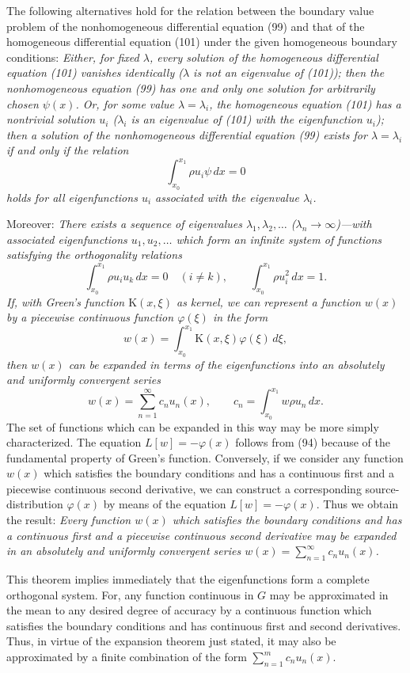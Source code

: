 The following alternatives hold for the relation between the boundary value problem of the nonhomogeneous differential equation (99) and that of the homogeneous differential equation (101) under the given homogeneous boundary conditions: \emph{Either, for fixed $\lambda$, every solution of the homogeneous differential equation (101) vanishes identically ($\lambda$ is not an eigenvalue of (101)); then the nonhomogeneous equation (99) has one and only one solution for arbitrarily chosen $\psi(x)$. Or, for some value $\lambda=\lambda_i$, the homogeneous equation (101) has a nontrivial solution $u_i$ ($\lambda_i$ is an eigenvalue of (101) with the eigenfunction $u_i$); then a solution of the nonhomogeneous differential equation (99) exists for $\lambda=\lambda_i$ if and only if the relation}
\[
\int_{x_0}^{x_1}\rho u_i\psi\,dx=0
\]
\emph{holds for all eigenfunctions $u_i$ associated with the eigenvalue $\lambda_i$.}

Moreover: \emph{There exists a sequence of eigenvalues $\lambda_1,\lambda_2,\ldots$ ($\lambda_n\to\infty$)---with associated eigenfunctions $u_1,u_2,\ldots$ which form an infinite system of functions satisfying the orthogonality relations}
\[
\int_{x_0}^{x_1}\rho u_i u_k\,dx=0\quad(i\ne k),
\qquad
\int_{x_0}^{x_1}\rho u_i^2\,dx=1.
\]
\emph{If, with Green's function $\mathrm K(x,\xi)$ as kernel, we can represent a function $w(x)$ by a piecewise continuous function $\varphi(\xi)$ in the form}
\[
w(x)=\int_{x_0}^{x_1}\mathrm K(x,\xi)\varphi(\xi)\,d\xi,
\]
\emph{then $w(x)$ can be expanded in terms of the eigenfunctions into an absolutely and uniformly convergent series}
\[
w(x)=\sum_{n=1}^{\infty}c_nu_n(x),
\qquad c_n=\int_{x_0}^{x_1}w\rho u_n\,dx.
\]
The set of functions which can be expanded in this way may be more simply characterized. The equation $L[w]=-\varphi(x)$ follows from (94) because of the fundamental property of Green's function. Conversely, if we consider any function $w(x)$ which satisfies the boundary conditions and has a continuous first and a piecewise continuous second derivative, we can construct a corresponding source-distribution $\varphi(x)$ by means of the equation $L[w]=-\varphi(x)$. Thus we obtain the result: \emph{Every function $w(x)$ which satisfies the boundary conditions and has a continuous first and a piecewise continuous second derivative may be expanded in an absolutely and uniformly convergent series $w(x)=\sum_{n=1}^{\infty}c_nu_n(x)$.}

This theorem implies immediately that the eigenfunctions form a complete orthogonal system. For, any function continuous in $G$ may be approximated in the mean to any desired degree of accuracy by a continuous function which satisfies the boundary conditions and has continuous first and second derivatives. Thus, in virtue of the expansion theorem just stated, it may also be approximated by a finite combination of the form $\sum_{n=1}^{m}c_nu_n(x)$.

